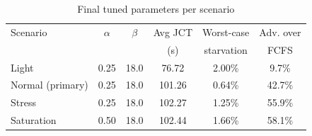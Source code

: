 \begin{table}[h]
\centering
\caption{Final tuned parameters per scenario}
\label{tab:tuned_params}
\begin{tabular}{@{}lccccc@{}}
\toprule
Scenario & $\alpha$ & $\beta$ & Avg JCT & Worst-case & Adv. over \\
 & & & (s) & starvation & FCFS \\
\midrule
Light            & 0.25 & 18.0 & 76.72  & 2.00\% & 9.7\%  \\
Normal (primary) & 0.25 & 18.0 & 101.26 & 0.64\% & 42.7\% \\
Stress           & 0.25 & 18.0 & 102.27 & 1.25\% & 55.9\% \\
Saturation       & 0.50 & 18.0 & 102.44 & 1.66\% & 58.1\% \\
\bottomrule
\end{tabular}
\end{table}